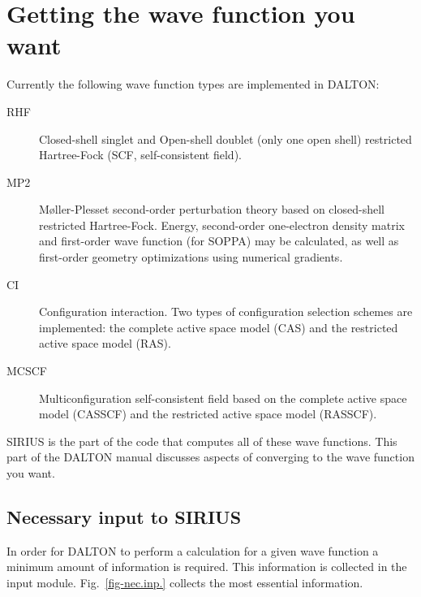 \chapter{\label{chap:wf-guide}Getting the wave function you want}

Currently the following wave function types are implemented in DALTON:

\begin{description}

\item[RHF] Closed-shell singlet and Open-shell doublet (only one open shell)
restricted Hartree-Fock (SCF, self-consistent
field).

\item[MP2] M{\o}ller-Plesset second-order perturbation
theory based on closed-shell
restricted Hartree-Fock.  Energy, second-order one-electron
density matrix and first-order wave function (for SOPPA) may be
calculated, as well as first-order geometry optimizations using
numerical gradients. 

\item[CI] Configuration interaction. Two types of configuration selection
schemes are implemented: the complete active space model (CAS) and the
restricted active space model (RAS).

\item[MCSCF] Multiconfiguration self-consistent field based on
the complete active space model (CASSCF) and
the restricted active space model
(RASSCF).

\end{description}

SIRIUS is the part of the code that computes all of these
wave functions.
This part of the DALTON manual discusses aspects of converging to the
wave function you want.

\section{\label{sec:ig_necinp} Necessary input to SIRIUS}

In order for DALTON to perform a calculation for a given wave function a
minimum amount of
information is required. This information is collected in the
 input module. Fig.~\ref{fig-nec.inp.} collects the most
essential information.


